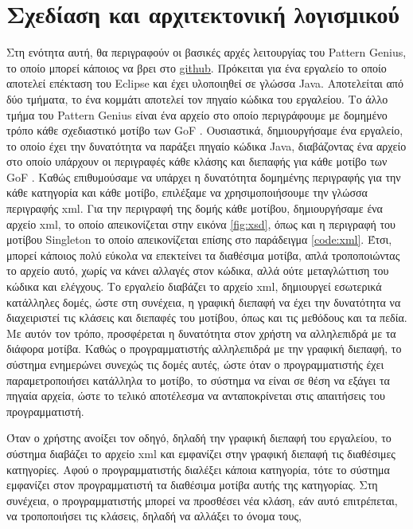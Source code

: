 \chapter{Σχεδίαση και αρχιτεκτονική λογισμικού}
\label{ch:architecture}
Στη ενότητα αυτή, θα περιγραφούν οι βασικές αρχές λειτουργίας του Pattern Genius, το οποίο μπορεί κάποιος να βρει 
στο \href{https://github.com/tasakos-dev/Pattern-Genius}{\color{blue}\underline{github}}. 
Πρόκειται για ένα εργαλείο το οποίο αποτελεί επέκταση του Eclipse και έχει υλοποιηθεί σε γλώσσα Java. 
Αποτελείται από δύο τμήματα, το ένα κομμάτι αποτελεί τον πηγαίο κώδικα του εργαλείου. Το άλλο τμήμα του Pattern Genius είναι 
ένα αρχείο στο οποίο περιγράφουμε με δομημένο τρόπο κάθε σχεδιαστικό μοτίβο των GoF \cite{GoF}. Ουσιαστικά, δημιουργήσαμε ένα εργαλείο, 
το οποίο έχει την δυνατότητα να παράξει πηγαίο κώδικα Java, διαβάζοντας ένα αρχείο στο οποίο υπάρχουν οι περιγραφές 
κάθε κλάσης και διεπαφής για κάθε μοτίβο των GoF \cite{GoF}. Καθώς επιθυμούσαμε να υπάρχει η δυνατότητα δομημένης περιγραφής 
για την κάθε κατηγορία και κάθε μοτίβο, επιλέξαμε να χρησιμοποιήσουμε την γλώσσα περιγραφής xml. Για την περιγραφή της δομής κάθε μοτίβου, 
δημιουργήσαμε ένα αρχείο xml, το οποίο απεικονίζεται στην εικόνα \ref{fig:xsd}, όπως και η περιγραφή του μοτίβου Singleton \cite{GoF} 
το οποίο απεικονίζεται επίσης στο παράδειγμα \ref{code:xml}. Έτσι, μπορεί κάποιος πολύ εύκολα να επεκτείνει τα διαθέσιμα μοτίβα, 
απλά τροποποιώντας το αρχείο αυτό, χωρίς να κάνει αλλαγές στον κώδικα, αλλά ούτε μεταγλώττιση του κώδικα και ελέγχους. 
Το εργαλείο διαβάζει το αρχείο xml, δημιουργεί εσωτερικά κατάλληλες δομές, ώστε στη συνέχεια, η γραφική διεπαφή 
να έχει την δυνατότητα να διαχειριστεί τις κλάσεις και διεπαφές του μοτίβου, όπως και τις μεθόδους και τα πεδία. 
Με αυτόν τον τρόπο, προσφέρεται η δυνατότητα στον χρήστη να αλληλεπιδρά με τα διάφορα μοτίβα. 
Καθώς ο προγραμματιστής αλληλεπιδρά με την γραφική διεπαφή, το σύστημα ενημερώνει συνεχώς τις δομές αυτές, 
ώστε όταν ο προγραμματιστής έχει παραμετροποιήσει κατάλληλα το μοτίβο, το σύστημα να είναι σε θέση να εξάγει τα πηγαία αρχεία, 
ώστε το τελικό αποτέλεσμα να ανταποκρίνεται στις απαιτήσεις του προγραμματιστή.
\par
Όταν ο χρήστης ανοίξει τον οδηγό, δηλαδή την γραφική διεπαφή του εργαλείου, το σύστημα διαβάζει το αρχείο xml 
και εμφανίζει στην γραφική διεπαφή τις διαθέσιμες κατηγορίες. Αφού ο προγραμματιστής διαλέξει κάποια κατηγορία, 
τότε το σύστημα εμφανίζει στον προγραμματιστή τα διαθέσιμα μοτίβα αυτής της κατηγορίας. Στη συνέχεια, 
ο προγραμματιστής μπορεί να προσθέσει νέα κλάση, εάν αυτό επιτρέπεται, να τροποποιήσει τις κλάσεις, δηλαδή να αλλάξει το όνομα τους, 
